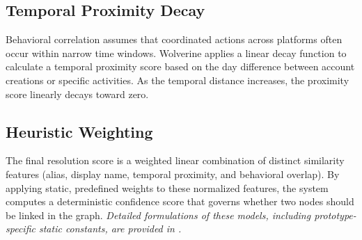\subsection{Temporal Proximity Decay}
Behavioral correlation assumes that coordinated actions across platforms often occur within narrow time windows. Wolverine applies a linear decay function to calculate a temporal proximity score based on the day difference between account creations or specific activities. As the temporal distance increases, the proximity score linearly decays toward zero.

\subsection{Heuristic Weighting}
The final resolution score is a weighted linear combination of distinct similarity features (alias, display name, temporal proximity, and behavioral overlap). By applying static, predefined weights to these normalized features, the system computes a deterministic confidence score that governs whether two nodes should be linked in the graph. 
\textit{Detailed formulations of these models, including prototype-specific static constants, are provided in .}
